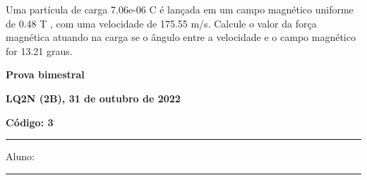 \documentclass[12pt, addpoints]{exam}
\begin{document}
\begin{questions}
\begin{multicols*}{2}
\begin{oneparchoices}
\end{oneparchoices}
\question[20] Uma partícula de carga 7.06e-06 C é lançada em um campo magnético uniforme de    0.48 T , com uma velocidade de 175.55 m/s. Calcule o valor da força magnética atuando na carga se o ângulo entre a velocidade e o campo magnético for   13.21 graus.

\begin{oneparchoices}
\end{oneparchoices}
\end{multicols*}
\end{questions}
\newpage
        \begin{minipage}[b]{0.75\linewidth}
            \begin{flushleft}
                {\bf \large Prova bimestral}
            \end{flushleft}
            \begin{flushleft}
                {\bf \large LQ2N (2B), 31 de outubro de 2022}
            \end{flushleft}
        \end{minipage}
        \begin{minipage}[b]{0.20\linewidth}
            \begin{flushright}
                {\bf \large Código: 3}
            \end{flushright}
        \end{minipage}
        \vspace{0.5cm} \hrule \vspace{0.5cm}
        \begin{minipage}{0.75\linewidth}
            Aluno:
        \end{minipage}
        \vspace{0.5cm} \hrule \vspace{0.5cm}
\end{document}
